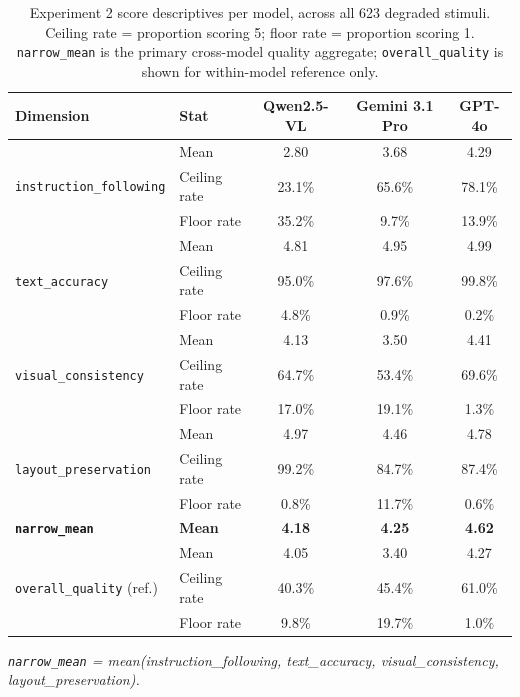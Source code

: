 \begin{table}[htbp]
\centering
\caption{Experiment 2 score descriptives per model, across all 623 degraded stimuli. Ceiling rate = proportion scoring 5; floor rate = proportion scoring 1. \texttt{narrow\_mean} is the primary cross-model quality aggregate; \texttt{overall\_quality} is shown for within-model reference only.}
\label{tab:score-descriptives}
\begin{tabular}{llccc}
\toprule
Dimension & Stat & Qwen2.5-VL & Gemini 3.1 Pro & GPT-4o \\
\midrule
\multirow{3}{*}{\texttt{instruction\_following}}
 & Mean         & 2.80  & 3.68  & 4.29  \\
 & Ceiling rate & 23.1\% & 65.6\% & 78.1\% \\
 & Floor rate   & 35.2\% &  9.7\% & 13.9\% \\
\midrule
\multirow{3}{*}{\texttt{text\_accuracy}}
 & Mean         & 4.81  & 4.95  & 4.99  \\
 & Ceiling rate & 95.0\% & 97.6\% & 99.8\% \\
 & Floor rate   &  4.8\% &  0.9\% &  0.2\% \\
\midrule
\multirow{3}{*}{\texttt{visual\_consistency}}
 & Mean         & 4.13  & 3.50  & 4.41  \\
 & Ceiling rate & 64.7\% & 53.4\% & 69.6\% \\
 & Floor rate   & 17.0\% & 19.1\% &  1.3\% \\
\midrule
\multirow{3}{*}{\texttt{layout\_preservation}}
 & Mean         & 4.97  & 4.46  & 4.78  \\
 & Ceiling rate & 99.2\% & 84.7\% & 87.4\% \\
 & Floor rate   &  0.8\% & 11.7\% &  0.6\% \\
\midrule
\textbf{\texttt{narrow\_mean}} & \textbf{Mean} & \textbf{4.18} & \textbf{4.25} & \textbf{4.62} \\
\midrule
\multirow{3}{*}{\texttt{overall\_quality} (ref.)}
 & Mean         & 4.05  & 3.40  & 4.27  \\
 & Ceiling rate & 40.3\% & 45.4\% & 61.0\% \\
 & Floor rate   &  9.8\% & 19.7\% &  1.0\% \\
\bottomrule
\end{tabular}

\smallskip
\footnotesize\textit{\texttt{narrow\_mean} = mean(instruction\_following, text\_accuracy, visual\_consistency, layout\_preservation).}
\end{table}

